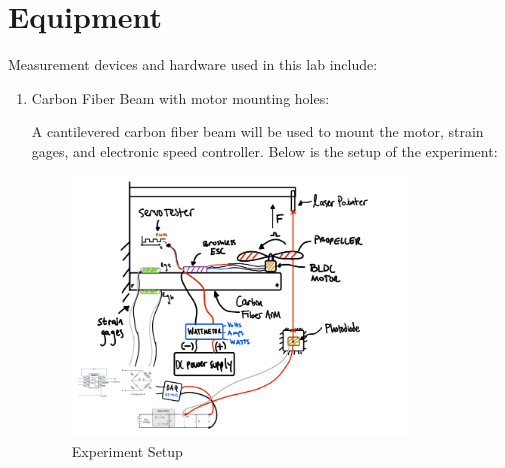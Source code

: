 \documentclass{article}
\begin{document}
\section{Equipment}

Measurement devices and hardware used in this lab include:
\begin{enumerate}
  \item Carbon Fiber Beam with motor mounting holes:
  \vspace{1mm}

  A cantilevered carbon fiber beam will be used to mount the motor, strain gages, and electronic speed controller. Below is the setup of the experiment:

  \begin{figure}[H]
    \centering
    \includegraphics[width = 0.85\textwidth]{finalprojectimages/finalprojectsetup.png}
    \caption{Experiment Setup}
    \label{fig:finalsetup}
  \end{figure}


   \vspace{2.5mm}


\end{enumerate}
\end{document}
